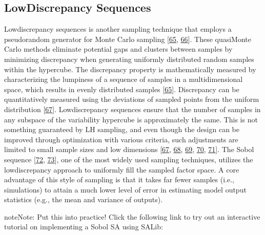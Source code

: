 \documentclass[a4paper,10pt,english]{book}
\begin{document}
\subsection{Low\sphinxhyphen{}Discrepancy Sequences}
\label{\detokenize{3_sensitivity_analysis_the_basics:low-discrepancy-sequences}}
\sphinxAtStartPar
Low\sphinxhyphen{}discrepancy sequences is another sampling technique that employs a pseudo\sphinxhyphen{}random generator for Monte Carlo sampling {[}\hyperlink{cite.index:id81}{65}, \hyperlink{cite.index:id92}{66}{]}. These quasi\sphinxhyphen{}Monte Carlo methods eliminate potential gaps and clusters between samples by minimizing discrepancy when generating uniformly distributed random samples within the hypercube. The discrepancy property is mathematically measured by characterizing the lumpiness of a sequence of samples in a multidimensional space, which results in evenly distributed samples {[}\hyperlink{cite.index:id81}{65}{]}. Discrepancy can be quantitatively measured using the deviations of sampled points from the uniform distribution {[}\hyperlink{cite.index:id95}{67}{]}. Low\sphinxhyphen{}discrepancy sequences ensure that the number of samples in any subspace of the variability hypercube is approximately the same. This is not something guaranteed by LH sampling, and even though the design can be improved through optimization with various criteria, such adjustments are limited to small sample sizes and low dimensions {[}\hyperlink{cite.index:id95}{67}, \hyperlink{cite.index:id93}{68}, \hyperlink{cite.index:id94}{69}, \hyperlink{cite.index:id96}{70}, \hyperlink{cite.index:id97}{71}{]}. The Sobol sequence {[}\hyperlink{cite.index:id98}{72}, \hyperlink{cite.index:id99}{73}{]}, one of the most widely used sampling techniques, utilizes the low\sphinxhyphen{}discrepancy approach to uniformly fill the sampled factor space. A core advantage of this style of sampling is that it takes far fewer samples (i.e., simulations) to attain a much lower level of error in estimating model output statistics (e.g., the mean and variance of outputs).

\begin{sphinxadmonition}{note}{Note:}
\sphinxAtStartPar
Put this into practice! Click the following link to try out an interactive tutorial on implementing a Sobol SA using SALib:

\sphinxAtStartPar
{}
\end{sphinxadmonition}
\end{document}
